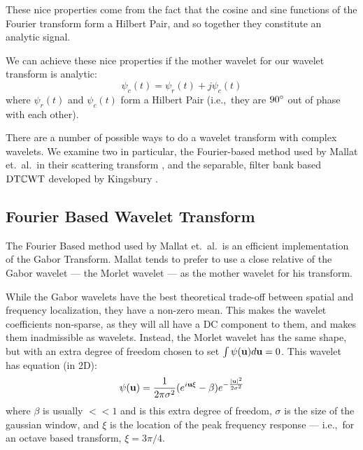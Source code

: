   These nice properties come from the fact that the cosine and sine functions of the
  Fourier transform form a Hilbert Pair, and so together they constitute an 
  analytic signal.

  We can achieve these nice properties if the mother wavelet for our wavelet
  transform is analytic:
  \begin{equation}
    \psi_{c}(t) = \psi_{r}(t) + j\psi_{c}(t) \label{eq:complex_wavelet}
  \end{equation}
  where $\psi_{r}(t)$ and $\psi_{c}(t)$ form a Hilbert Pair (i.e.,\ they are
  $90^{\circ}$ out of phase with each other).

  There are a number of possible ways to do a wavelet transform with complex
  wavelets. We examine two in particular, the Fourier-based method used by
  Mallat et.\ al.\ in their scattering transform
  \citep{bruna_classification_2011, bruna_invariant_2013, bruna_scattering_2013,
  oyallon_generic_2013, oyallon_deep_2015, sifre_rotation_2013,
  sifre_rigid-motion_2014, sifre_rigid-motion_2014-1, sifre_scatnet_2013}, and
  the separable, filter bank based $\mathrm{DT}\mathbb{C}\mathrm{WT}$ developed by Kingsbury
  \citep{kingsbury_wavelet_1997, kingsbury_dual-tree_1998,
  kingsbury_dual-tree_1998-1,  kingsbury_image_1999, kingsbury_shift_1999,
  kingsbury_dual-tree_2000, kingsbury_complex_2001, selesnick_dual-tree_2005}.

\subsection{Fourier Based Wavelet Transform}\label{sec:morlet_fourier}
  The Fourier Based method used by Mallat et.\ al.\ is an efficient
  implementation of the Gabor Transform. Mallat tends to prefer to use a close
  relative of the Gabor wavelet --- the Morlet wavelet --- as the mother wavelet
  for his transform. 
  
  While the Gabor wavelets have the best theoretical trade-off between spatial
  and frequency localization, they have a non-zero mean.  This makes the
  wavelet coefficients non-sparse, as they will all have a DC component to
  them, and makes them inadmissible as wavelets. Instead, the Morlet wavelet
  has the same shape, but with an extra degree of freedom chosen to set $\int
  \psi (\mathbf{u}) d\mathbf{u} =0$.  This wavelet has equation (in 2D):
  \begin{equation}
    \psi(\mathbf{u}) = \frac{1}{2\pi\sigma^2} {(e^{i\mathbf{u}\xi} - \beta)}
                     e^{-\frac{|\mathbf{u}|^2}{2\sigma^2}} 
    \label{eq:morlet}
  \end{equation}
  where $\beta$ is usually $<<1$ and is this extra degree of freedom, 
  $\sigma$ is the size of the gaussian window, and $\xi$ is the
  location of the peak frequency response --- i.e.,\ for an octave based
  transform, $\xi = 3\pi/4$.

